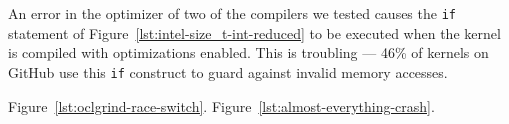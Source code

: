 An error in the optimizer of two of the compilers we tested
causes the \texttt{if} statement of Figure~\ref{lst:intel-size_t-int-reduced} to be executed when the kernel is compiled with optimizations enabled.
This is troubling --- 46\% of kernels on GitHub use this \texttt{if} construct to guard against invalid memory accesses. 


 Figure~\ref{lst:oclgrind-race-switch}.
 Figure~\ref{lst:almost-everything-crash}.
